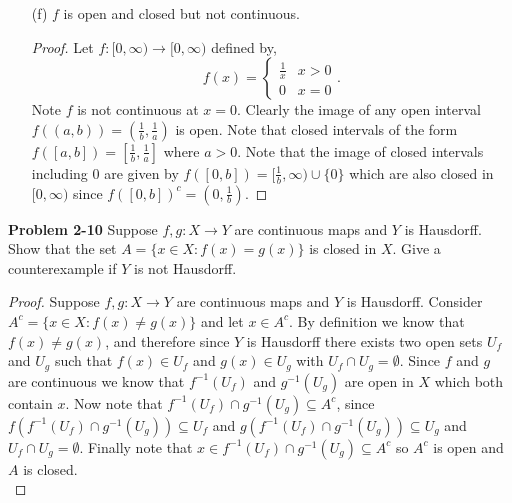 \documentclass[minion]{homework651}
\begin{document}
\begin{problems}
\begin{enumerate}
    \item[(f)] $f$ is open and closed but not continuous.
    \begin{proof} Let $f:[0, \infty) \to [0, \infty)$ defined by, 
        \begin{equation*}
            f(x) = \begin{cases} 
                \frac{1}{x} & x > 0\\
                0 & x = 0
             \end{cases}.
        \end{equation*} 
        Note $f$ is not continuous at $x = 0$. Clearly the image of any open interval $f((a, b)) = (\frac{1}{b}, \frac{1}{a})$ is open. 
        Note that closed intervals of the form $f([a, b]) = [\frac{1}{b}, \frac{1}{a}]$ where $a > 0$. Note that the image of closed intervals including $0$ are given by 
        $f([0, b]) = [\frac{1}{b},\infty) \cup \{0\}$ which are also closed in $[0, \infty)$ since $f([0, b])^{c} = (0, \frac{1}{b})$.  
    \end{proof}

\end{enumerate}











\problem \textbf{Problem 2-10} Suppose $f, g: X \to Y$ are continuous maps and $Y$ is Hausdorff. Show that the 
set $A = \{x \in X: f(x) = g(x)\}$ is closed in $X$. Give a counterexample if $Y$ is not Hausdorff. 
\begin{proof}
    Suppose $f, g: X \to Y$ are continuous maps and $Y$ is Hausdorff. Consider $A^c = \{x \in X: f(x) \neq g(x)\}$ 
    and let $x \in A^c$. By definition we know that $f(x) \neq g(x)$, and therefore since $Y$ is Hausdorff there exists
    two open sets $U_f$ and $U_g$ such that $f(x) \in U_f$ and $g(x) \in U_g$ with $U_f \cap U_g = \emptyset$. Since $f$ and $g$ are continuous we 
    know that $f^{-1}(U_f)$ and $g^{-1}(U_g)$ are open in $X$ which both contain $x$. Now note that $f^{-1}(U_f) \cap g^{-1}(U_g) \subseteq A^c$,
    since $f(f^{-1}(U_f) \cap g^{-1}(U_g)) \subseteq  U_f$ and $g(f^{-1}(U_f) \cap g^{-1}(U_g)) \subseteq  U_g$ and $U_f \cap U_g = \emptyset$.
    Finally note that $x \in f^{-1}(U_f) \cap g^{-1}(U_g) \subseteq A^c$ so $A^c$ is open and $A$ is closed.\\




\end{proof}
\end{problems}
\end{document}
